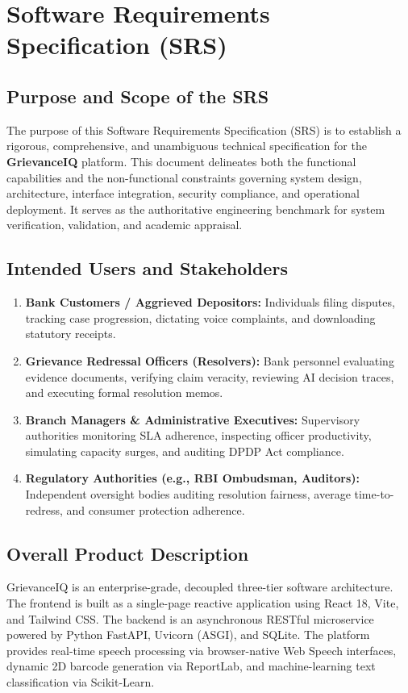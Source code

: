 \chapter{Software Requirements Specification (SRS)}

\section{Purpose and Scope of the SRS}
The purpose of this Software Requirements Specification (SRS) is to establish a rigorous, comprehensive, and unambiguous technical specification for the \textbf{GrievanceIQ} platform. This document delineates both the functional capabilities and the non-functional constraints governing system design, architecture, interface integration, security compliance, and operational deployment. It serves as the authoritative engineering benchmark for system verification, validation, and academic appraisal.

\section{Intended Users and Stakeholders}
\begin{enumerate}
    \item \textbf{Bank Customers / Aggrieved Depositors:} Individuals filing disputes, tracking case progression, dictating voice complaints, and downloading statutory receipts.
    \item \textbf{Grievance Redressal Officers (Resolvers):} Bank personnel evaluating evidence documents, verifying claim veracity, reviewing AI decision traces, and executing formal resolution memos.
    \item \textbf{Branch Managers \& Administrative Executives:} Supervisory authorities monitoring SLA adherence, inspecting officer productivity, simulating capacity surges, and auditing DPDP Act compliance.
    \item \textbf{Regulatory Authorities (e.g., RBI Ombudsman, Auditors):} Independent oversight bodies auditing resolution fairness, average time-to-redress, and consumer protection adherence.
\end{enumerate}

\section{Overall Product Description}
GrievanceIQ is an enterprise-grade, decoupled three-tier software architecture. The frontend is built as a single-page reactive application using React 18, Vite, and Tailwind CSS. The backend is an asynchronous RESTful microservice powered by Python FastAPI, Uvicorn (ASGI), and SQLite. The platform provides real-time speech processing via browser-native Web Speech interfaces, dynamic 2D barcode generation via ReportLab, and machine-learning text classification via Scikit-Learn.

